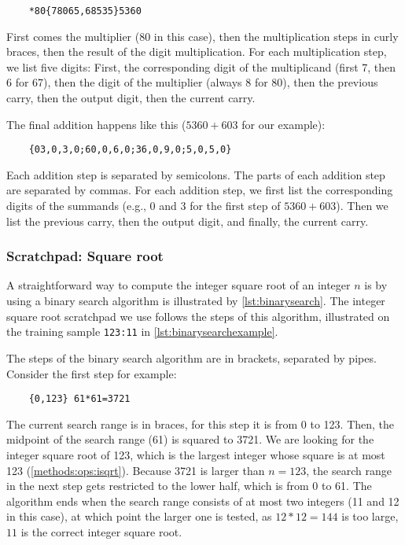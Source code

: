 \begin{lstlisting}
	*80{78065,68535}5360
\end{lstlisting}

First comes the multiplier (80 in this case), then the multiplication steps in curly braces, then the result of the digit multiplication.
For each multiplication step, we list five digits: First, the corresponding digit of the multiplicand (first 7, then 6 for 67), then the digit of the multiplier (always 8 for 80), then the previous carry, then the output digit, then the current carry.

The final addition happens like this ($5360+603$ for our example):

\begin{lstlisting}
	{03,0,3,0;60,0,6,0;36,0,9,0;5,0,5,0}
\end{lstlisting}

Each addition step is separated by semicolons. The parts of each addition step are separated by commas. For each addition step, we first list the corresponding digits of the summands (e.g., 0 and 3 for the first step of $5360+603$). Then we list the previous carry, then the output digit, and finally, the current carry.

\FloatBarrier
\subsubsection{Scratchpad: Square root}
\label{sqrt_scratchpad}

A straightforward way to compute the integer square root of an integer $n$ is by using a binary search algorithm is illustrated by \cref{lst:binarysearch}.
The integer square root scratchpad we use follows the steps of this algorithm, illustrated on the training sample \verb|123:11| in \cref{lst:binarysearchexample}.

The steps of the binary search algorithm are in brackets, separated by pipes.
Consider the first step for example:
\begin{lstlisting}
	{0,123} 61*61=3721
\end{lstlisting}

The current search range is in braces, for this step it is from 0 to 123.
Then, the midpoint of the search range (61) is squared to 3721.
We are looking for the integer square root of 123, which is the largest integer whose square is at most 123 (\cref{methods:ops:isqrt}). Because 3721 is larger than $n=123$, the search range in the next step gets restricted to the lower half, which is from 0 to 61.
The algorithm ends when the search range consists of at most two integers (11 and 12 in this case), at which point the larger one is tested, as $12*12=144$ is too large, $11$ is the correct integer square root.

